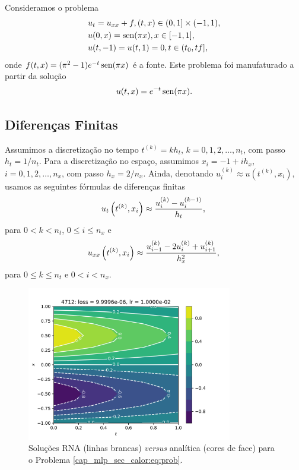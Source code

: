 Consideramos o problema
\begin{subequations}\label{cap_mlp_sec_calor:eq:prob}
  \begin{align}
    &u_t = u_{xx} + f, (t,x)\in (0, 1] \times (-1, 1),\\
    &u(0,x) = \operatorname{sen}(\pi x), x\in [-1, 1],\\
    &u(t,-1) = u(t,1) = 0, t\in (t_0, tf],
  \end{align}
\end{subequations}
onde $f(t,x) = (\pi^2 - 1)e^{-t}\operatorname{sen}(\pi x)$ é a fonte. Este problema foi manufaturado a partir da solução
\begin{equation}
  u(t,x) = e^{-t}\operatorname{sen}(\pi x).
\end{equation}

\subsection{Diferenças Finitas}

Assumimos a discretização no tempo $t^{(k)} = kh_t$, $k = 0, 1, 2, \dotsc, n_t$, com passo $h_t = 1/n_t$. Para a discretização no espaço, assumimos $x_{i} = -1 + ih_x$, $i = 0, 1, 2, \dotsc, n_x$, com passo $h_x = 2/n_x$. Ainda, denotando $u^{(k)}_i \approx u\left(t^{(k)}, x_i\right)$, usamos as seguintes fórmulas de diferenças finitas
\begin{equation}
  u_t\left(t^{(k)}, x_i\right) \approx \frac{u_i^{(k)} - u_i^{(k-1)}}{h_t},\\
\end{equation}
para $0<k<n_t$, $0\leq i\leq n_x$ e
\begin{equation}
  u_{xx}\left(t^{(k)}, x_i\right) \approx \frac{u_{i-1}^{(k)} - 2u_i^{(k)} + u_{i+1}^{(k)}}{h_x^2},\\
\end{equation}
para $0\leq k\leq n_t$ e $0 < i < n_x$.

\begin{figure}[H]
  \centering
  \includegraphics[width=0.8\textwidth]{./cap_mlp/dados/fig_mlp_calor/fig}
  \caption{Soluções RNA (linhas brancas) \textit{versus} analítica (cores de face) para o Problema \ref{cap_mlp_sec_calor:eq:prob}.}
  \label{cap_mlp_sec_calor:fig:rna_calor}
\end{figure}

